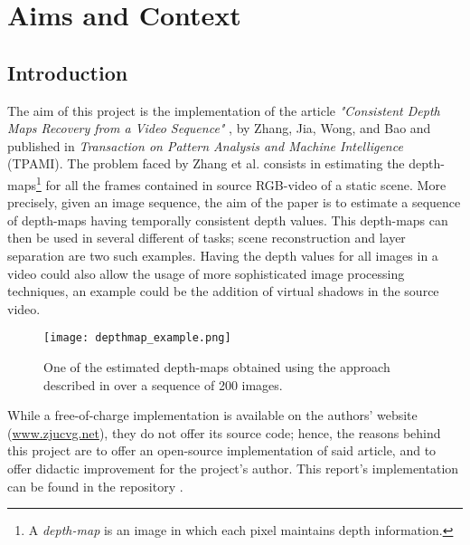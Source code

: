 \chapter{Aims and Context}
\section{Introduction}\label{sec:introduction}
The aim of this project is the implementation of the article \textit{"Consistent Depth Maps Recovery from a Video Sequence"} \cite{Zhang2009}, by Zhang, Jia, Wong, and Bao and published in \textit{Transaction on Pattern Analysis and Machine Intelligence} (TPAMI).
The problem faced by Zhang et al. consists in estimating the {depth-maps}\footnote{A \emph{depth-map} is an image in which each pixel maintains depth information.} for all the frames contained in source RGB-video of a static scene.
More precisely, given an image sequence, the aim of the paper is to estimate a sequence of depth-maps having temporally consistent depth values.
This depth-maps can then be  used in several different of tasks; scene reconstruction and layer separation are two such examples. Having the depth values for all images in a video could also allow the usage of more sophisticated image processing techniques, an example could be the addition of virtual shadows in the source video.
\begin{figure}[!h]
	\centering
	\texttt{[image: depthmap\_example.png]} %
	\caption{One of the estimated depth-maps  obtained using the approach described in \cite{Zhang2009} over a sequence of 200 images.}
\end{figure}
\begin{tcolorbox}[title=Note:]
While a free-of-charge implementation is available on the authors' website (\url{www.zjucvg.net}), they do not offer its source code; hence, the reasons behind this project are to offer an open-source implementation of said article, and to offer didactic improvement for the project's author.
This report's implementation can be found in the \Github{} repository
\ProjectUrl{}.
\end{tcolorbox}

